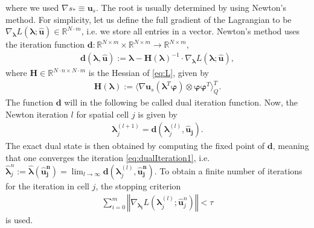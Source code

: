 where we used $\nabla s_* \equiv \bm u_s$. The root is usually determined by using Newton's method. For simplicity, let us define the full gradient of the Lagrangian to be $\nabla_{\bm{\lambda}}L(\bm{\lambda};\bm{\hat{u}})\in\mathbb{R}^{N\cdot m}$, i.e. we store all entries in a vector. Newton's method uses the iteration function $\bm{d}:\mathbb{R}^{N\times m}\times\mathbb{R}^{N\times m}\to\mathbb{R}^{N\times m}$,
\begin{align}\label{eq:dualIterationFunction}
\bm{d}(\bm{\lambda},\bm{\hat{u}}):= \bm{\lambda}-\bm{H}(\bm{\lambda})^{-1}\cdot\nabla_{\bm{\lambda}}L(\bm{\lambda};\bm{\hat{u}}),
\end{align}
where $\bm H\in\mathbb{R}^{N \cdot n\times N\cdot m}$ is the Hessian of \eqref{eq:L}, given by
\begin{align*}
\bm{H}(\bm{\lambda}) := \langle \nabla \bm{u}_{s} (\bm{\lambda}^T\bm{\varphi})\otimes\bm{\varphi}\bm{\varphi}^T\rangle_Q^{T}.
\end{align*}
The function $\bm d$ will in the following be called dual iteration function. Now, the Newton iteration $l$  for spatial cell $j$ is given by
\begin{align}\label{eq:dualIteration1}
\bm{\lambda}^{(l+1)}_j = \bm{d}(\bm{\lambda}_j^{(l)},\bm{\hat{u}_j}).
\end{align}
The exact dual state is then obtained by computing the fixed point of $\bm{d}$, meaning that one converges the iteration \eqref{eq:dualIteration1}, i.e. $\bm{\hat\lambda}_j^n:=\bm{\hat\lambda}(\bm{\hat u_j^n})=\lim_{l\rightarrow\infty}\bm{d}(\bm{\lambda}_j^{(l)},\bm{\hat{u}_j^n})$.
To obtain a finite number of iterations for the iteration in cell $j$, the stopping criterion 
\begin{align}\label{eq:tauCrit}
\sum_{i=0}^m\left\Vert \nabla_{\bm{\lambda_i}}L(\bm{\lambda}_j^{(l)};\bm{\hat{u}}_j^n) \right\Vert < \tau
\end{align}
is used.

